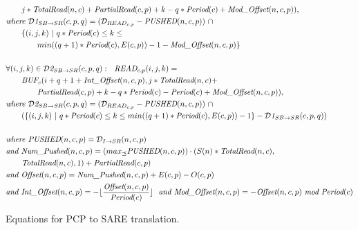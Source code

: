 \begin{figure}[ht]
{\begin{minipage}{6.3in}
\begin{itemize}
\begin{align}
                  &~~~~~~j*\mt{TotalRead}(n,c) + 
                    \mt{PartialRead}(c,p) + k
                   - q * \mt{Period}(c) + \mt{Mod\_Offset}(n,c,p)), \\
&\mt{where }{{\cal D}\mt{1}}_{SB \rightarrow SR}(c,p,q) = 
  ({\cal D}_{{READ}_{c, p}} - \mt{PUSHED}(n,c,p))
                         ~\cap~ \\ \nonumber
	&~~~~~~\{ (i,j,k)~|~q * \mt{Period}(c)
                                \le k 
                                \le \\ \nonumber
	&~~~~~~~~~~~~min((q+1)*\mt{Period}(c),
         E(c, p)) - 1 
         - \mt{Mod\_Offset}(n,c,p) \}\\ \nonumber\\
\label{buf2read1}
%
%
&\forall (i,j,k) \in {{\cal D}\mt{2}}_{SB \rightarrow SR}(c,p,q):~~
\mt{READ}_{c, p}(i,j,k) = \nonumber\\
    &~~~~~~\mt{BUF}_{c}(i+q+
                  1 + \mt{Int\_Offset}(n,c,p),
                  j*\mt{TotalRead}(n,c) + \\\nonumber
                    &~~~~~~~~~~~~\mt{PartialRead}(c,p)
		+ k
                   - q * \mt{Period}(c) 
                   - \mt{Period}(c)
 + \mt{Mod\_Offset}(n,c,p)),\\ \nonumber&
\mt{where }{{\cal D}\mt{2}}_{SB \rightarrow SR}(c,p,q) = 
  ({\cal D}_{{READ}_{c, p}} - \mt{PUSHED}(n,c,p)) ~\cap~ \\ \nonumber
                         &~~~~~~( \{ (i,j,k)~|~q * \mt{Period}(c)
                                \le k 
                                \le min((q+1)*\mt{Period}(c),
                                E(c, p)) - 1 \} - {{\cal D}\mt{1}}_{SB \rightarrow SR}(c,p,q) )\\ \nonumber \\
\label{buf2read2}
%
%
&\mt{where }\mt{PUSHED}(n,c,p) = {\cal D}_{I \rightarrow SR}(n,c,p) \nonumber\\ \nonumber
&\mt{and }\mt{Num\_Pushed}(n,c,p) = 
  (max_{\preceq}\mt{PUSHED}(n,c,p)) \cdot (S(n) * \mt{TotalRead}(n,c), \\ \nonumber
                                        &~~~~~~\mt{TotalRead}(n,c), 1 ) + \mt{PartialRead}(c, p) \\ \nonumber
&\mt{and }\mt{Offset}(n,c,p) = \mt{Num\_Pushed}(n,c,p) + E(c,p)-O(c,p) \\ \nonumber
&\mt{and }\mt{Int\_Offset}(n,c,p) = - \lfloor \frac{\mt{Offset}(n,c,p)}{\mt{Period}(c)} \rfloor 
~~\mt{and }\mt{Mod\_Offset}(n,c,p) = - \mt{Offset}(n,c,p)~\mt{mod}~\mt{Period}(c) \nonumber
%
\end{align}
\vspace{-12pt}
\end{itemize}
\end{minipage}}
\caption{Equations for PCP to SARE translation.
\protect\label{fig:pcptosare3}}
\end{figure}